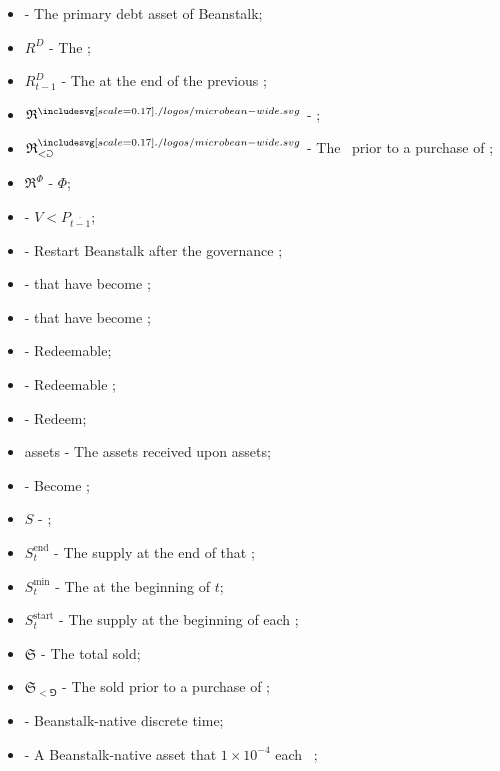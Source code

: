 \documentclass[class=article, crop=false]{standalone}
\begin{document}
\begin{itemize}[topsep=0pt, itemsep=3pt,leftmargin=16pt]
    \item[]  - The primary debt asset of Beanstalk;
    \item[] $R^D$ - The ;
    \item[] $R^D_{t-1}$ - The  at the end of the previous ;
    \item[] $\mathfrak{R}^{\bean}$ -  \Bean;
    \item[] $\mathfrak{R}_{<\Game}^{\bean}$ - The  \Bean\ prior to a purchase of ;
    \item[] $\mathfrak{R}^{\Phi}$ -  $\Phi$;
    \item[]  - $V < P_{\overline{t-1}}$;
    \item[]  - Restart Beanstalk after the governance ;
    \item[]   -  that have become ;
    \item[]   -  that have become ;
    \item[]  - Redeemable;
    \item[]   - Redeemable ;
    \item[]  - Redeem;
    \item[]  assets - The assets received upon   assets;
    \item[]  - Become ;
    \item[] $S$ - ;
    \item[] $S_t^{\text{end}}$ - The  supply at the end of that ;
    \item[] $S_t^{\text{min}}$ - The  at the beginning of $t$;
    \item[] $S_t^{\text{start}}$ - The  supply at the beginning of each ;
    \item[] $\mathfrak{S}$ - The total  sold;
    \item[] $\mathfrak{S}_{<\Game}$ - The  sold prior to a purchase of ;
    \item[]  - Beanstalk-native discrete time;
    \item[]  - A Beanstalk-native asset that  $1 \times 10^{-4}$  each  ;

\end{itemize}
\end{document}
